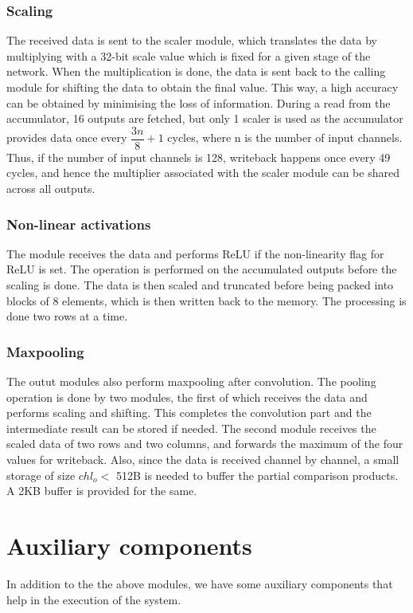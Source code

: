 \documentclass[a4paper,12pt, final]{report}
\begin{document}
\subsubsection{Scaling}

The received data is sent to the scaler module, which translates the data by multiplying with a 32-bit scale value which is fixed for a given stage of the network. When the multiplication is done, the data is sent back to the calling module for shifting the data to obtain the final value. This way, a high accuracy can be obtained by minimising the loss of information. During a read from the accumulator, 16 outputs are fetched, but only 1 scaler is used as the accumulator provides data once every $\dfrac{3n}{8}+ 1$ cycles, where n is the number of input channels. Thus, if the number of input channels is 128, writeback happens once every 49 cycles, and hence the multiplier associated with the scaler module can be shared across all outputs.

\subsubsection{Non-linear activations}

The module receives the data and performs ReLU if the non-linearity flag for ReLU is set. The operation is performed on the accumulated outputs before the scaling is done. The data is then scaled and truncated before being packed into blocks of 8 elements, which is then written back to the memory. The processing is done two rows at a time. 

\subsubsection{Maxpooling}
The outut modules also perform maxpooling after convolution. The pooling operation is done by two modules, the first of which receives the data and performs scaling and shifting. This completes the convolution part and the intermediate result can be stored if needed. The second module receives the scaled data of two rows and two columns, and forwards the maximum of the four values for writeback. Also, since the data is received channel by channel, a small storage of size $chl_o <$ 512B is needed to buffer the partial comparison products. A 2KB buffer is provided for the same.


\section{Auxiliary components}
In addition to the the above modules, we have some auxiliary components that help in the execution of the system.
\end{document}
